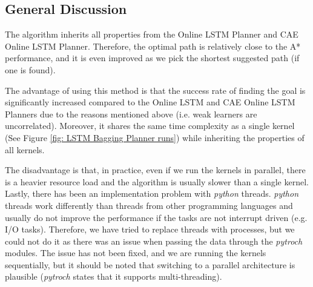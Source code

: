 \subsection{General Discussion}

The algorithm inherits all properties from the Online LSTM Planner and CAE Online LSTM Planner. Therefore, the optimal path is relatively close to the A* performance, and it is even improved as we pick the shortest suggested path (if one is found).

The advantage of using this method is that the success rate of finding the goal is significantly increased compared to the Online LSTM and CAE Online LSTM Planners due to the reasons mentioned above (i.e. weak learners are uncorrelated). Moreover, it shares the same time complexity as a single kernel (See Figure \ref{fig: LSTM Bagging Planner runs}) while inheriting the properties of all kernels.

The disadvantage is that, in practice, even if we run the kernels in parallel, there is a heavier resource load and the algorithm is usually slower than a single kernel. Lastly, there has been an implementation problem with \textit{python} threads. \textit{python} threads work differently than threads from other programming languages and usually do not improve the performance if the tasks are not interrupt driven (e.g. I/O tasks). Therefore, we have tried to replace threads with processes, but we could not do it as there was an issue when passing the data through the \textit{pytroch} modules. The issue has not been fixed, and we are running the kernels sequentially, but it should be noted that switching to a parallel architecture is plausible (\textit{pytroch} states that it supports multi-threading).

